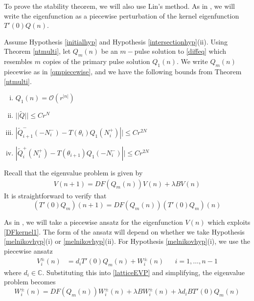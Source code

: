 \documentclass[12pt]{article}
\def\C{{\mathbb C}}
\begin{document}
To prove the stability theorem, we will also use Lin's method. As in \cite{Sandstede1998}, we will write the eigenfunction as a piecewise perturbation of the kernel eigenfunction $T'(0)Q(n)$. 

Assume Hypothesis \ref{initialhyp} and Hypothesis \ref{intersectionhyp}(ii). Using Theorem \ref{ntmulti}, let $Q_m(n)$ be an $m-$pulse solution to \eqref{diffeq} which resembles $m$ copies of the primary pulse solution $Q_1(n)$. We write $Q_m(n)$ piecewise as in \eqref{qmpiecewise}, and we have the following bounds from Theorem \ref{ntmulti}.
\begin{enumerate}[(i)]
\item $Q_1(n) = \mathcal{O}(r^|n|)$
\item $||\tilde{Q}|| \leq C r^N$
\item $|\tilde{Q}_{i+1}^-(-N_i^-) - T(\theta_i) Q_1(N_i^+)|| \leq C r^{2N}$ 
\item $|\tilde{Q}_i^+(N_i^+) - T(\theta_{i+1}) Q_1(-N_i^-)|| \leq C r^{2N}$
\end{enumerate}

Recall that the eigenvalue problem is given by 
\begin{align*}
V(n+1) = DF(Q_m(n)) V(n) + \lambda B V(n)
\end{align*}
It is straightforward to verify that 
\begin{equation}\label{DFkernel1}
(T'(0)Q_m)(n+1) = DF(Q_m(n))(T'(0)Q_m)(n)
\end{equation}

As in \cite{Sandstede1998}, we will take a piecewise ansatz for the eigenfunction $V(n)$ which exploits \eqref{DFkernel1}. The form of the ansatz will depend on whether we take Hypothesis \ref{melnikovhyp}(i) or \ref{melnikovhyp}(ii). For Hypothesis \ref{melnikovhyp}(i), we use the piecewise ansatz
\begin{align*}
V_i^\pm(n) &= d_i T'(0) Q_m(n) + W_i^\pm(n) 
&& i = 1, \dots, n-1
\end{align*}
where $d_i \in \C$. Substituting this into \eqref{latticeEVP} and simplifying, the eigenvalue problem becomes
\begin{equation}\label{EVPhypi}
W_i^\pm(n) = DF(Q_m(n)) W_i^\pm(n) + \lambda B W_i^\pm(n) + \lambda d_i B T'(0)Q_m(n)
\end{equation}
\end{document}
